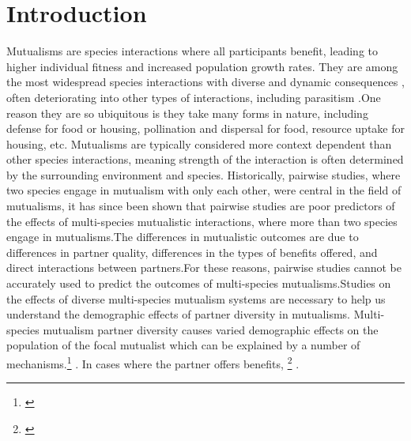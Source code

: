 \documentclass[11pt]{article}\usepackage[sc]{mathpazo} %
\newcommand{\ali}[2]{{\color{pink}{#1}}\footnote{\textit{\color{pink}{#2}}}}
\begin{document}
\newpage{}
\section*{Introduction}
  Mutualisms are species interactions where all participants benefit, leading to higher individual fitness and increased population growth rates. They are among the most widespread species interactions\cite{Chamberlain2014, BoucherDouglasH.1985} with diverse and dynamic consequences \cite{Bronstein1994,Chamberlain2014,Frederickson2013}, often deteriorating into other types of interactions, including parasitism \cite{Rodriguez-Rodriguez2017,Song2020,Mandyam2014,Thrall2007, Bahia2022}.One reason they are so ubiquitous is they take many forms in nature, including defense for food or housing\cite{Willmer1997}, pollination and dispersal for food\cite{Sakai2002,Burns2004}, resource uptake for housing\cite{Holland2010}, etc. Mutualisms are typically considered more context dependent than other species interactions\cite{Chamberlain2014,Frederickson2013}, meaning strength of the interaction is often determined by the surrounding environment and species. Historically, pairwise studies, where two species engage in mutualism with only each other, were central in the field of mutualisms, it has since been shown that pairwise studies are poor predictors of the effects of multi-species mutualistic interactions\cite{Afkhami2014,Palmer2010}, where more than two species engage in mutualisms.The differences in mutualistic outcomes are due to differences in partner quality\cite{Bascompte2019,Stanton2013,Frederickson2013,Jones2015, Ness2006}, differences in the types of benefits offered\cite{Kiers2003,Afkhami2014}, and direct interactions between partners\cite{Sun2019,Heath2009,Heath2014,Grutter2003}.For these reasons, pairwise studies cannot be accurately used to predict the outcomes of multi-species mutualisms\cite{Palmer2010, Stanton2013, Chamberlain2014, Song2020}.Studies on the effects of diverse multi-species mutualism systems are necessary to help us understand the demographic effects of partner diversity in mutualisms\cite{Bascompte2019}. Multi-species mutualism partner diversity causes varied demographic effects on the population of the focal mutualist which can be explained by a number of mechanisms.\ali{In some cases, the quality of the benefits offered varies leading to some partners which benefit the individual, some which have neither a positive or negative impact on the individual, and some which negatively impact the host}{Is this the best way to introduce this or should I talk about quality of benefits compared to cost of rewards? AKA some partners offer a net benefit when the benefits outweigh the cost of rewards to the partner ... etc.} \cite{Bronstein1994,Bronstein2001a,Afkhami2014,Song2020,West2007,Frederickson2013,Jones2015}. In cases where the partner offers benefits, \ali{the function, or type of benefits, offered by the partner can vary}{Is this enough detail or do I need to go into examples?} \cite{Stanton2003}.
  
\end{document}
